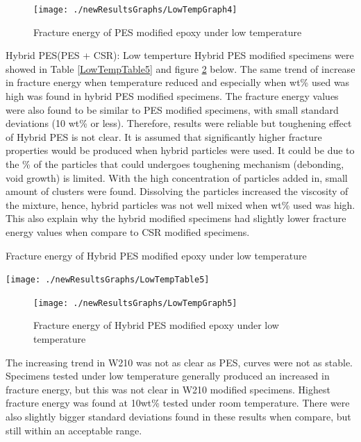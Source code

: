 \documentclass[numbers=noendperiod,chapterprefix=on]{icldt} %
\begin{document}
\begin{figure}[!hp]
\centering
\texttt{[image: ./newResultsGraphs/LowTempGraph4]}
\caption{Fracture energy of PES modified epoxy under low temperature}\label{LowTempGraph4}
\end{figure}
\FloatBarrier
\newpage
Hybrid PES(PES + CSR):
Low temperture Hybrid PES modified specimens were showed in Table \ref{LowTempTable5} and figure \ref{LowTempGraph5} below.
The same trend of increase in fracture energy when temperature reduced and especially when wt\% used was high was found in hybrid PES modified specimens. The fracture energy values were also found to be similar to PES modified specimens, with small standard deviations (10 wt\% or less). Therefore, results were reliable but toughening effect of Hybrid PES is not clear. It is assumed that significantly higher fracture properties would be produced when hybrid particles were used. It could be due to the \% of the particles that could undergoes toughening mechanism (debonding, void growth) is limited. With the high concentration of particles added in, small amount of clusters were found. Dissolving the particles increased the viscosity of the mixture, hence, hybrid particles was not well mixed when wt\% used was high. This also explain why the hybrid modified specimens had slightly lower fracture energy values when compare to CSR modified specimens.

\begin{table}[!hp]
\centering
\caption{Fracture energy of Hybrid PES modified epoxy under low temperature} \label{LowTempTable5}
\texttt{[image: ./newResultsGraphs/LowTempTable5]}
\end{table}
\FloatBarrier

\begin{figure}[!hp]
\centering
\texttt{[image: ./newResultsGraphs/LowTempGraph5]}
\caption{Fracture energy of Hybrid PES modified epoxy under low temperature}\label{LowTempGraph5}
\end{figure}
\FloatBarrier

The increasing trend in W210 was not as clear as PES, curves were not as stable. Specimens tested under low temperature generally produced an increased in fracture energy, but this was not clear in W210 modified specimens. Highest fracture energy was found at 10wt\% tested under room temperature. There were also slightly bigger standard deviations found in these results when compare, but still within an acceptable range.  
\end{document}
